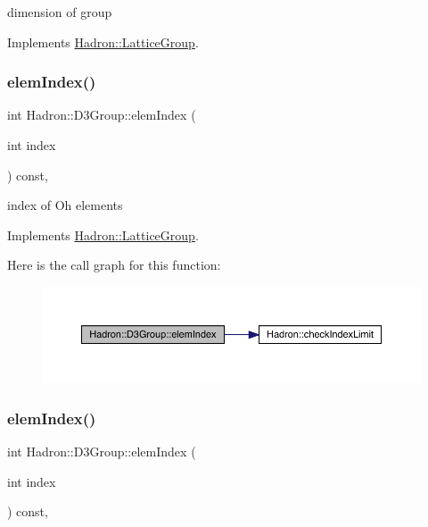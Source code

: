 dimension of group 

Implements \mbox{\hyperlink{structHadron_1_1LatticeGroup_abd8415698323796ef6a8605796ee3bea}{Hadron\+::\+Lattice\+Group}}.

\mbox{\label{structHadron_1_1D3Group_a90ac88df35dd8e919637917dc22ee903}} 
\subsubsection{\texorpdfstring{elemIndex()}{elemIndex()}\hspace{0.1cm}{\footnotesize\ttfamily [1/3]}}
{\footnotesize\ttfamily int Hadron\+::\+D3\+Group\+::elem\+Index (\begin{DoxyParamCaption}\item[{int}]{index }\end{DoxyParamCaption}) const\hspace{0.3cm}{\ttfamily [inline]}, {\ttfamily [virtual]}}

index of Oh elements 

Implements \mbox{\hyperlink{structHadron_1_1LatticeGroup_afb8e3ee60de059f75bce1044c694e1e8}{Hadron\+::\+Lattice\+Group}}.

Here is the call graph for this function\+:
\nopagebreak
\begin{figure}[H]
\begin{center}
\leavevmode
\includegraphics[width=350pt]{de/de1/structHadron_1_1D3Group_a90ac88df35dd8e919637917dc22ee903_cgraph}
\end{center}
\end{figure}
\mbox{\label{structHadron_1_1D3Group_a90ac88df35dd8e919637917dc22ee903}} 
\subsubsection{\texorpdfstring{elemIndex()}{elemIndex()}\hspace{0.1cm}{\footnotesize\ttfamily [2/3]}}
{\footnotesize\ttfamily int Hadron\+::\+D3\+Group\+::elem\+Index (\begin{DoxyParamCaption}\item[{int}]{index }\end{DoxyParamCaption}) const\hspace{0.3cm}{\ttfamily [inline]}, {\ttfamily [virtual]}}

